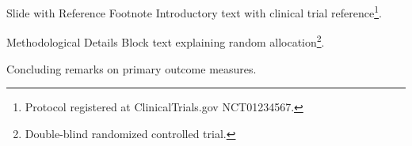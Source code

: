 \documentclass[14pt,t]{beamer-accessibility}
\begin{document}
\begin{frame}{Slide with Reference Footnote}
Introductory text with clinical trial reference\footnote{Protocol registered at ClinicalTrials.gov NCT01234567.}.

\begin{block}{Methodological Details}
Block text explaining random allocation\footnote{Double-blind randomized controlled trial.}.
\end{block}

Concluding remarks on primary outcome measures.
\end{frame}
\end{document}

